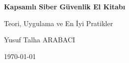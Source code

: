 \documentclass[11pt,a4paper,twoside]{book}
\newcommand{\KitapBaslik}{Kapsamlı Siber Güvenlik El Kitabı}
\newcommand{\KitapAltBaslik}{Teori, Uygulama ve En İyi Pratikler}
\newcommand{\YazarAdi}{Yusuf Talha ARABACI}
\begin{document}
\begin{titlepage}
  \centering
  \vspace*{2cm}
  \vspace{1.5cm}
  {\Huge\bfseries \KitapBaslik \par}
  \vspace{0.5cm}
  {\Large \KitapAltBaslik \par}
  \vfill
  {\Large \YazarAdi \par}
  \vspace{1cm}
  {\large \today \par}
\end{titlepage}

\frontmatter
\tableofcontents
\mainmatter
















\backmatter
\end{document}
